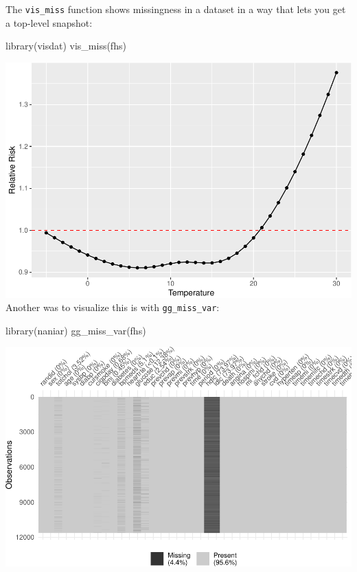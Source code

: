 \documentclass[
]{book}
\newenvironment{Shaded}{\begin{snugshade}}{\end{snugshade}}
\newcommand{\FunctionTok}[1]{\textcolor[rgb]{0.00,0.00,0.00}{#1}}
\newcommand{\NormalTok}[1]{#1}
\begin{document}
The \texttt{vis\_miss} function shows missingness in a dataset in a way that lets you
get a top-level snapshot:

\begin{Shaded}
\begin{Highlighting}[]
\FunctionTok{library}\NormalTok{(visdat)}
\FunctionTok{vis\_miss}\NormalTok{(fhs)}
\end{Highlighting}
\end{Shaded}

\includegraphics{adv_epi_analysis_files/figure-latex/unnamed-chunk-73-1.pdf}
Another was to visualize this is with \texttt{gg\_miss\_var}:

\begin{Shaded}
\begin{Highlighting}[]
\FunctionTok{library}\NormalTok{(naniar)}
\FunctionTok{gg\_miss\_var}\NormalTok{(fhs)}
\end{Highlighting}
\end{Shaded}

\includegraphics{adv_epi_analysis_files/figure-latex/unnamed-chunk-74-1.pdf}
\end{document}
